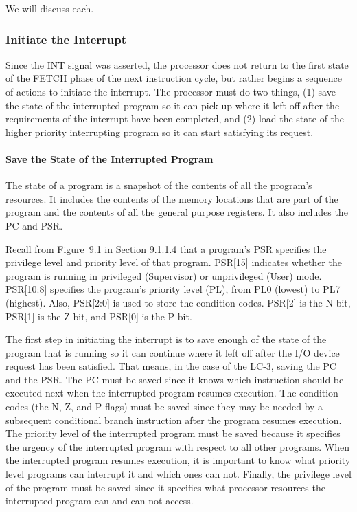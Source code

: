 \documentclass{patt}
\begin{document}
We will discuss each.

\subsubsection{Initiate the Interrupt} 

Since the INT signal was asserted, the processor does not return to
the first state of the FETCH phase of the next instruction cycle, but
rather begins a sequence of actions to initiate the 
interrupt.  The processor must do two things, (1) save the state of the
interrupted program so it can pick up where it left off after the
requirements of the interrupt have been completed, and (2) load the state of 
the higher priority interrupting program so it can start satisfying its request.
 
\paragraph{Save the State of the Interrupted Program}

The state of a program is a snapshot of the contents of all the
program's resources.  It includes the contents of the
memory locations that are part of the program and the contents of all
the general purpose registers. It also includes the PC and PSR.

Recall from Figure~9.1 in Section 9.1.1.4 that a program's PSR specifies 
the privilege level and priority level of that program.
PSR[15] indicates whether the program is running in privileged
(Supervisor) or unprivileged (User) mode.  PSR[10:8] specifies the 
program's priority level (PL), from PL0 (lowest) to PL7 (highest). 
Also, PSR[2:0] is used to store the condition codes.
PSR[2] is the N bit, PSR[1] is the Z bit, and PSR[0] is the P bit.

The first step in initiating the interrupt is to save enough of the
state of the program that is running so it can continue where it left
off after the I/O device request has been satisfied. That means, in
the case of the LC-3, saving the PC and the PSR. The PC must be saved
since it knows which instruction should be executed next when the
interrupted program resumes execution. The condition codes (the N, Z,
and P flags) must be saved since they may be needed by a subsequent
conditional branch instruction after the program resumes execution.
The priority level of the interrupted program must be saved because it
specifies the urgency of the interrupted program with respect to all
other programs. When the interrupted program resumes execution, it is
important to know what priority level programs can interrupt it 
and which ones can not. Finally, the privilege level of the program
must be saved since it specifies what processor
resources the interrupted program can and can not access.
\end{document}
